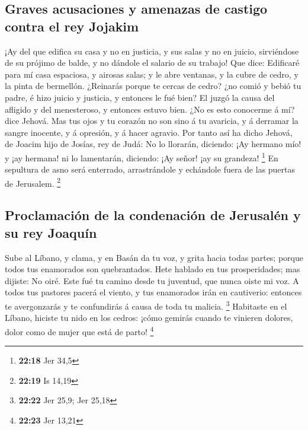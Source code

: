 \hypertarget{graves-acusaciones-y-amenazas-de-castigo-contra-el-rey-jojakim}{%
\subsection{Graves acusaciones y amenazas de castigo contra el rey
Jojakim}\label{graves-acusaciones-y-amenazas-de-castigo-contra-el-rey-jojakim}}

 ¡Ay del que edifica su casa y no en justicia, y sus
salas y no en juicio, sirviéndose de su prójimo de balde, y no dándole
el salario de su trabajo!  Que dice: Edificaré para mí
casa espaciosa, y airosas salas; y le abre ventanas, y la cubre de
cedro, y la pinta de bermellón.  ¿Reinarás porque te
cercas de cedro? ¿no comió y bebió tu padre, é hizo juicio y justicia, y
entonces le fué bien?  El juzgó la causa del afligido y
del menesteroso, y entonces estuvo bien. ¿No es esto conocerme á mí?
dice Jehová.  Mas tus ojos y tu corazón no son sino á tu
avaricia, y á derramar la sangre inocente, y á opresión, y á hacer
agravio.  Por tanto así ha dicho Jehová, de Joacim hijo
de Josías, rey de Judá: No lo llorarán, diciendo: ¡Ay hermano mío! y ¡ay
hermana! ni lo lamentarán, diciendo: ¡Ay señor! ¡ay su grandeza!
\footnote{\textbf{22:18} Jer 34,5}  En sepultura de asno
será enterrado, arrastrándole y echándole fuera de las puertas de
Jerusalem. \footnote{\textbf{22:19} Is 14,19}

\hypertarget{proclamaciuxf3n-de-la-condenaciuxf3n-de-jerusaluxe9n-y-su-rey-joaquuxedn}{%
\subsection{Proclamación de la condenación de Jerusalén y su rey
Joaquín}\label{proclamaciuxf3n-de-la-condenaciuxf3n-de-jerusaluxe9n-y-su-rey-joaquuxedn}}

 Sube al Líbano, y clama, y en Basán da tu voz, y grita
hacia todas partes; porque todos tus enamorados son quebrantados.
 Hete hablado en tus prosperidades; mas dijiste: No oiré.
Este fué tu camino desde tu juventud, que nunca oiste mi voz.
 A todos tus pastores pacerá el viento, y tus enamorados
irán en cautiverio: entonces te avergonzarás y te confundirás á causa de
toda tu malicia. \footnote{\textbf{22:22} Jer 25,9; Jer 25,18}
 Habitaste en el Líbano, hiciste tu nido en los cedros:
¡cómo gemirás cuando te vinieren dolores, dolor como de mujer que está
de parto! \footnote{\textbf{22:23} Jer 13,21}


